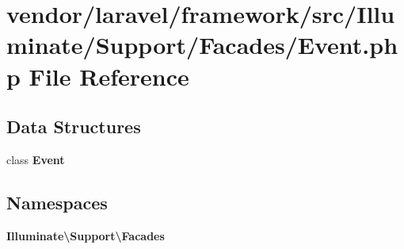 \section{vendor/laravel/framework/src/\+Illuminate/\+Support/\+Facades/\+Event.php File Reference}
\label{vendor_2laravel_2framework_2src_2_illuminate_2_support_2_facades_2_event_8php}
\subsection*{Data Structures}
\begin{DoxyCompactItemize}
\item 
class {\bf Event}
\end{DoxyCompactItemize}
\subsection*{Namespaces}
\begin{DoxyCompactItemize}
\item 
 {\bf Illuminate\textbackslash{}\+Support\textbackslash{}\+Facades}
\end{DoxyCompactItemize}
